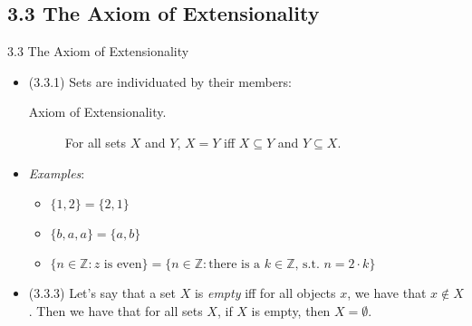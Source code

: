 \documentclass[../slides.tex]{subfiles}
\begin{document}
\subsection{3.3 The Axiom of Extensionality}
\begin{frame}{3.3 The Axiom of Extensionality}

	\begin{itemize}
	
		\item (3.3.1) Sets are individuated by their members:
		
\begin{description}
	\item[Axiom of Extensionality.] For all sets $X$ and $Y$, $X=Y$ iff $X\subseteq Y$ and $Y\subseteq X$. 
\end{description}
		
	\item \emph{Examples}:
	
		\begin{itemize}
		
			\item $\{1,2\}=\{2,1\}$
			
			\item $\{b,a,a\}=\{a,b\}$
			
			\item $\{n\in\mathbb{Z}:z\text{ is even}\}=\{n\in\mathbb{Z}:\text{there is a }k\in \mathbb{Z}\text{, s.t. }n=2\cdot k\}$
		
		\end{itemize}
		
	\item (3.3.3) Let's say that a set $X$ is \emph{empty} iff for all objects $x$, we have that $x\notin X$. Then we have that for all sets $X$, if $X$ is empty, then $X=\emptyset$.

		
	\end{itemize}

\end{frame}
\end{document}
